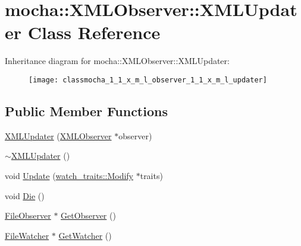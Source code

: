 \hypertarget{classmocha_1_1_x_m_l_observer_1_1_x_m_l_updater}{
\section{mocha::XMLObserver::XMLUpdater Class Reference}
\label{classmocha_1_1_x_m_l_observer_1_1_x_m_l_updater}
}
Inheritance diagram for mocha::XMLObserver::XMLUpdater:\begin{figure}[H]
\begin{center}
\leavevmode
\texttt{[image: classmocha\_1\_1\_x\_m\_l\_observer\_1\_1\_x\_m\_l\_updater]}
\end{center}
\end{figure}
\subsection*{Public Member Functions}
\begin{DoxyCompactItemize}
\item 
\hyperlink{classmocha_1_1_x_m_l_observer_1_1_x_m_l_updater_a66b4a73d2075c7c7ea6f15493024af93}{XMLUpdater} (\hyperlink{classmocha_1_1_x_m_l_observer}{XMLObserver} $\ast$observer)
\item 
\hyperlink{classmocha_1_1_x_m_l_observer_1_1_x_m_l_updater_a55d2a1fad337631a31bf119cd982a936}{$\sim$XMLUpdater} ()
\item 
void \hyperlink{classmocha_1_1_x_m_l_observer_1_1_x_m_l_updater_ab2d9bc54ead18acb65084d8405eb9570}{Update} (\hyperlink{structmocha_1_1watch__traits_1_1_modify}{watch\_\-traits::Modify} $\ast$traits)
\item 
void \hyperlink{classmocha_1_1_x_m_l_observer_1_1_x_m_l_updater_a337cc9a5191ace52ad8b651f0518ab12}{Die} ()
\item 
\hyperlink{classmocha_1_1_file_observer}{FileObserver} $\ast$ \hyperlink{classmocha_1_1_x_m_l_observer_1_1_x_m_l_updater_a4760142ca311fbf5e3e484691d6d6c9f}{GetObserver} ()
\item 
\hyperlink{classmocha_1_1_file_watcher}{FileWatcher} $\ast$ \hyperlink{classmocha_1_1_x_m_l_observer_1_1_x_m_l_updater_a36fcb475ffc1080ed9fe0b0e5615bade}{GetWatcher} ()
\end{DoxyCompactItemize}
